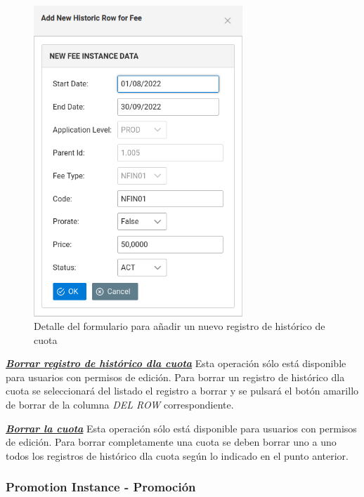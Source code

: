 \begin{figure}[H]
  \centering
  \includegraphics[width=0.70\textwidth]{imaxes/nuevo-historico-cuota.png}
  \caption{Detalle del formulario para añadir un nuevo registro de histórico de cuota}
  \label{fig:nuevo-historico-cuota}
\end{figure}



\underline{\textsl{\textbf{Borrar registro de histórico dla cuota}}}\newline
Esta operación sólo está disponible para usuarios con permisos de edición.
Para borrar un registro de histórico dla cuota se seleccionará del listado el registro a borrar y se pulsará el botón amarillo de borrar de la columna \textit{DEL ROW} correspondiente.\newline

\underline{\textsl{\textbf{Borrar la cuota}}}\newline
Esta operación sólo está disponible para usuarios con permisos de edición.
Para borrar completamente una cuota se deben borrar uno a uno todos los registros de histórico dla cuota según lo indicado en el punto anterior. 




\subsubsection{Promotion Instance - Promoción}
\label{sub:promotion}


